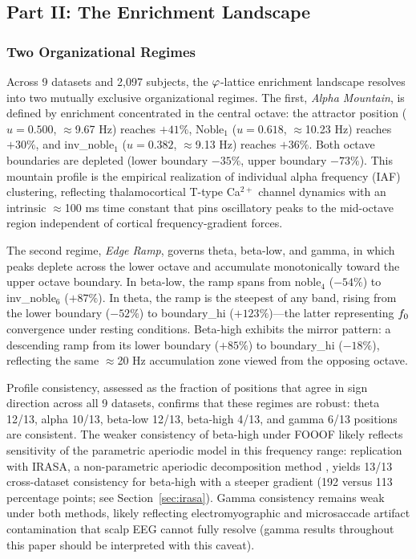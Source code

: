 \subsection{Part II: The Enrichment Landscape}

\subsubsection{Two Organizational Regimes}
\label{sec:two-regimes}

Across 9 datasets and 2,097 subjects, the $\varphi$-lattice enrichment landscape resolves into two mutually exclusive organizational regimes. The first, \textit{Alpha Mountain}, is defined by enrichment concentrated in the central octave: the attractor position ($u = 0.500$, $\approx$9.67 Hz) reaches $+41\%$, Noble$_1$ ($u = 0.618$, $\approx$10.23 Hz) reaches $+30\%$, and inv\_noble$_1$ ($u = 0.382$, $\approx$9.13 Hz) reaches $+36\%$. Both octave boundaries are depleted (lower boundary $-35\%$, upper boundary $-73\%$). This mountain profile is the empirical realization of individual alpha frequency (IAF) clustering, reflecting thalamocortical T-type Ca$^{2+}$ channel dynamics with an intrinsic $\approx$100 ms time constant that pins oscillatory peaks to the mid-octave region independent of cortical frequency-gradient forces.

The second regime, \textit{Edge Ramp}, governs theta, beta-low, and gamma, in which peaks deplete across the lower octave and accumulate monotonically toward the upper octave boundary. In beta-low, the ramp spans from noble$_4$ ($-54\%$) to inv\_noble$_6$ ($+87\%$). In theta, the ramp is the steepest of any band, rising from the lower boundary ($-52\%$) to boundary\_hi ($+123\%$)---the latter representing $f_0$ convergence under resting conditions. Beta-high exhibits the mirror pattern: a descending ramp from its lower boundary ($+85\%$) to boundary\_hi ($-18\%$), reflecting the same $\approx$20 Hz accumulation zone viewed from the opposing octave.

Profile consistency, assessed as the fraction of positions that agree in sign direction across all 9 datasets, confirms that these regimes are robust: theta 12/13, alpha 10/13, beta-low 12/13, beta-high 4/13, and gamma 6/13 positions are consistent. The weaker consistency of beta-high under FOOOF likely reflects sensitivity of the parametric aperiodic model in this frequency range: replication with IRASA, a non-parametric aperiodic decomposition method \parencite{wen2016irasa,gerster2022irasa}, yields 13/13 cross-dataset consistency for beta-high with a steeper gradient (192 versus 113 percentage points; see Section~\ref{sec:irasa}). Gamma consistency remains weak under both methods, likely reflecting electromyographic and microsaccade artifact contamination that scalp EEG cannot fully resolve (gamma results throughout this paper should be interpreted with this caveat).

